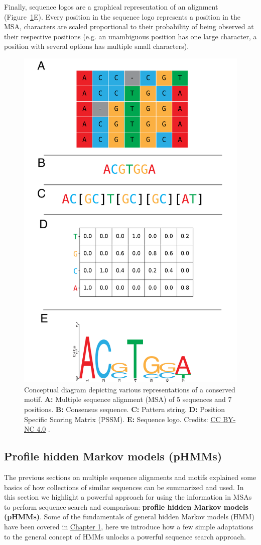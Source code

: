 Finally, sequence logos are a graphical representation of an alignment (Figure~\ref{motif_concept}E). Every position in the sequence logo represents a position in the MSA, characters are scaled proportional to their probability of being observed at their respective positions (e.g. an unambiguous position has one large character, a position with several options has multiple small characters).

\begin{figure}[!htbp]
\centering
\includegraphics[width=0.6\linewidth]{files/msa-pattern-pssm-log-5b80b466575997384e0c8bd00280fcc2.pdf}
\caption[]{Conceptual diagram depicting various representations of a conserved motif. \textbf{A:} Multiple sequence alignment (MSA) of 5 sequences and 7 positions. \textbf{B:} Consensus sequence. \textbf{C:} Pattern string. \textbf{D:} Position Specific Scoring Matrix (PSSM). \textbf{E:} Sequence logo.
Credits: \href{https://creativecommons.org/licenses/by-nc/4.0/}{CC BY-NC 4.0} \cite{own_2_2024}.}
\label{motif_concept}
\end{figure}

\subsection{Profile hidden Markov models (pHMMs)}

The previous sections on multiple sequence alignments and motifs explained some basics of how collections of similar sequences can be summarized and used. In this section we highlight a powerful approach for using the information in MSAs to perform sequence search and comparison: \textbf{profile hidden Markov models (pHMMs)}. Some of the fundamentals of general hidden Markov models (HMM) have been covered in \href{/chapter1}{Chapter 1}, here we introduce how a few simple adaptations to the general concept of HMMs unlocks a powerful sequence search approach.

